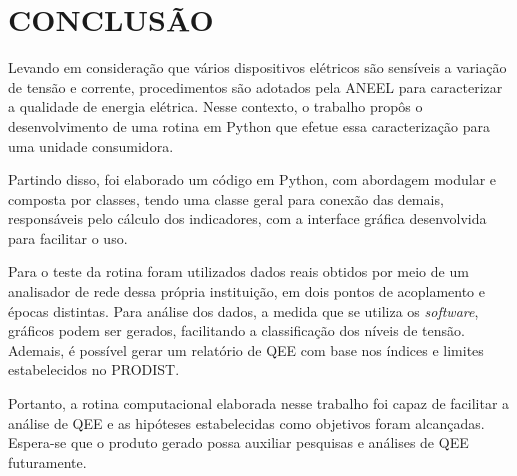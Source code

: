 \chapter{CONCLUSÃO}



Levando em consideração que vários dispositivos elétricos são sensíveis a variação de tensão e corrente, procedimentos são adotados pela ANEEL para caracterizar a qualidade de energia elétrica. Nesse contexto, o trabalho propôs o desenvolvimento de uma rotina em Python que efetue essa caracterização para uma unidade consumidora.


Partindo disso, foi elaborado um código em Python, com abordagem modular e composta por classes, tendo uma classe geral para conexão das demais, responsáveis pelo cálculo dos indicadores, com a interface gráfica desenvolvida para facilitar o uso.


Para o teste da rotina foram utilizados dados reais obtidos por meio de um analisador de rede dessa própria instituição, em dois pontos de acoplamento e épocas distintas. Para análise dos dados, a medida que se utiliza os \textit{software}, gráficos podem ser gerados, facilitando a classificação dos níveis de tensão. Ademais, é possível gerar um relatório de QEE com base nos índices e limites estabelecidos no PRODIST.


Portanto, a rotina computacional elaborada nesse trabalho foi capaz de facilitar a análise de QEE e as hipóteses estabelecidas como objetivos foram alcançadas. Espera-se que o produto gerado possa auxiliar pesquisas e análises de QEE futuramente.

